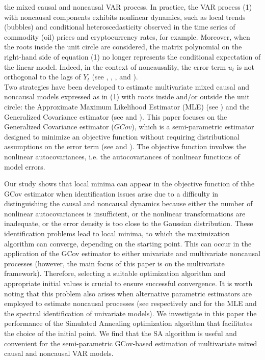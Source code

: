 \documentclass[<1p>]{elsarticle} %
\begin{document}
the mixed causal and noncausal VAR process.  In practice, the VAR process (1) with noncausal components exhibits nonlinear dynamics, such as local trends (bubbles) and conditional heteroscedasticity observed in the time series of commodity (oil) prices and cryptocurrency rates, for example. Moreover, when the roots inside the unit circle are considered, the matrix polynomial on the right-hand side of equation (1) no longer represents the conditional expectation of the linear model. Indeed, in the context of noncausality, the error term $u_t$ is not orthogonal to the lags of $Y_{t}$ (see \cite{lanne2013noncausal}, \cite{hecq2016identification}, \cite{cubadda2019detecting}, and \cite{gourieroux2017noncausal} \cite{gourieroux2022nonlinear}).\\
\indent Two strategies have been developed to estimate multivariate mixed causal and noncausal models expressed as in (1) with roots inside and/or outside the unit circle: the Approximate Maximum Likelihood Estimator (MLE) (see \cite{davis2020noncausal}) and the Generalized Covariance estimator (see \cite{gourieroux2017noncausal} and \cite{gourieroux2022generalized}). This paper focuses on the Generalized Covariance estimator ($GCov$), which is a semi-parametric estimator designed to minimize an objective function without requiring distributional assumptions on the error term (see \cite{gourieroux2017noncausal} and \cite{gourieroux2022generalized}). The objective function involves the nonlinear autocovariances, i.e. the autocovariances of nonlinear functions of model errors. 

Our study shows that local minima can appear in the objective function of thhe GCov estimator when identification issues arise due to a difficulty in distinguishing the causal and noncausal dynamics because either the number of nonlinear autocovariances is insufficient, or the nonlinear transformations are inadequate, or the error density is too close to the Gaussian distribution. These identification problems lead to local minima, to which the maximization algorithm can converge, depending on the starting point. This can occur in the application of the GCov estimator to either univariate and multivariate noncausal processes (however, the main focus of this paper is on the multivariate framework). Therefore, selecting a suitable  optimization algorithm and appropriate initial values is crucial to ensure successful convergence. It is worth noting that this problem also arises when alternative parametric estimators are employed to estimate noncausal processes (see respectively \cite{bec2020mixed} and \cite{hecq2022spectral} for the MLE and the spectral identification of univariate models). We investigate in this paper the performance of the Simulated Annealing optimization algorithm that facilitates the choice of the initial point. We find that the SA algorithm is useful and convenient for the semi-parametric GCov-based estimation of multivariate mixed causal and noncausal VAR models. 
\end{document}
